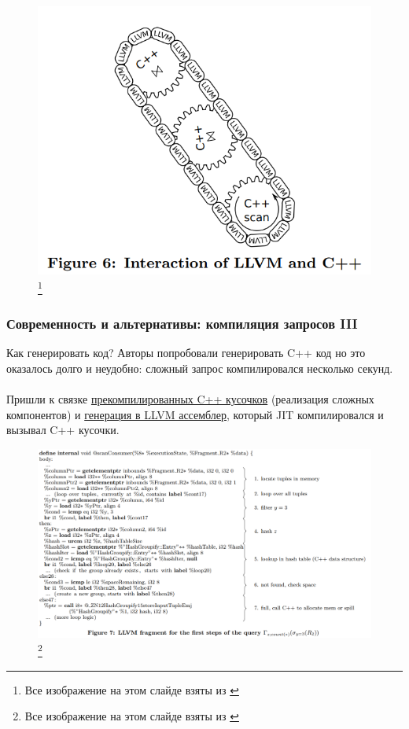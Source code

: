 \documentclass{beamer}
\begin{document}
\begin{frame}[fragile]
	\begin{figure}[htb]
		\includegraphics[width=\textwidth,height=0.30\textheight,keepaspectratio]{compilation-1.png}\footnote{\tiny{Все изображение на этом слайде взяты из \cite{Neumann2011}}}
	\end{figure}
	
\end{frame}

\begin{frame}[fragile]
	\frametitle{Современность и альтернативы: компиляция запросов III}
	Как генерировать код? Авторы попробовали генерировать C++ код но это оказалось долго и неудобно: сложный запрос компилировался несколько секунд. 
	\\~\\
	Пришли к связке \underline{прекомпилированных C++ кусочков} (реализация сложных компонентов) и \underline{генерация в LLVM ассемблер}, который JIT компилировался и вызывал C++ кусочки.
	\begin{figure}[htb]
		\includegraphics[width=\textwidth,height=0.40\textheight,keepaspectratio]{compilation-4.png}\footnote{\tiny{Все изображение на этом слайде взяты из \cite{Neumann2011}}}
	\end{figure}
	
\end{frame}
\end{document}
